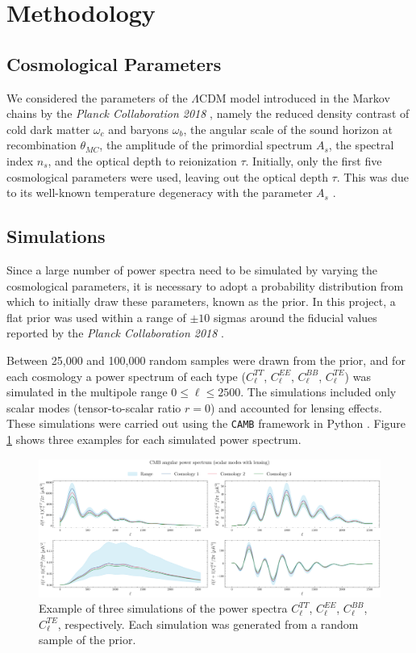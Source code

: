 \section{Methodology}
\subsection{Cosmological Parameters}
We considered the parameters of the $\Lambda$CDM model introduced in the Markov chains by the \textit{Planck Collaboration 2018} \cite{planck2018}, namely the reduced density contrast of cold dark matter $\omega_c$ and baryons $\omega_b$, the angular scale of the sound horizon at recombination $\theta_{MC}$, the amplitude of the primordial spectrum $A_s$, the spectral index $n_s$, and the optical depth to reionization $\tau$. Initially, only the first five cosmological parameters were used, leaving out the optical depth $\tau$. This was due to its well-known temperature degeneracy with the parameter $A_s$ \cite{HuWhite1997}.

\subsection{Simulations}
Since a large number of power spectra need to be simulated by varying the cosmological parameters, it is necessary to adopt a probability distribution from which to initially draw these parameters, known as the prior. In this project, a flat prior was used within a range of $\pm 10$ sigmas around the fiducial values reported by the \textit{Planck Collaboration 2018} \cite{planck2018}.  

Between 25,000 and 100,000 random samples were drawn from the prior, and for each cosmology a power spectrum of each type ($C_{\ell}^{TT}$, $C_{\ell}^{EE}$, $C_{\ell}^{BB}$, $C_{\ell}^{TE}$) was simulated in the multipole range $0 \leq \ell \leq 2500$. The simulations included only scalar modes (tensor-to-scalar ratio \(r = 0\)) and accounted for lensing effects. These simulations were carried out using the \texttt{CAMB} framework in Python \cite{CAMB}. Figure \ref{fig:example_sim} shows three examples for each simulated power spectrum.  

\begin{figure}
    \centering
    \includegraphics[scale=0.225]{img/cmb_aps_subplot_0.pdf}
    \caption{Example of three simulations of the power spectra $C_{\ell}^{TT}$, $C_{\ell}^{EE}$, $C_{\ell}^{BB}$, $C_{\ell}^{TE}$, respectively. Each simulation was generated from a random sample of the prior.}
    \label{fig:example_sim}
\end{figure}

